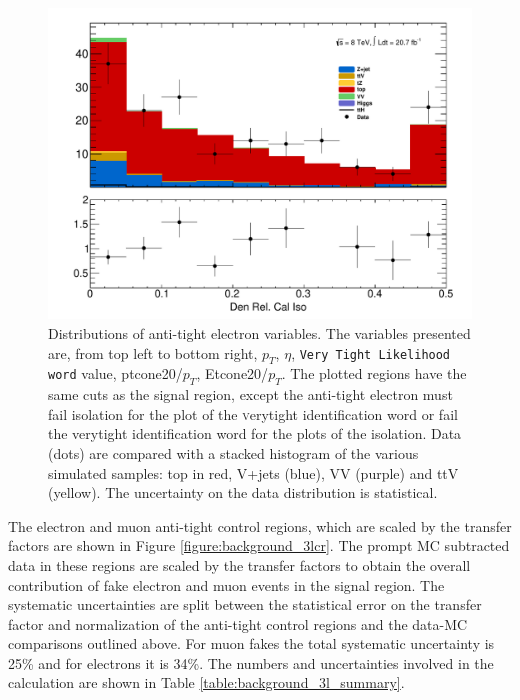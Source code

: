 \begin{figure}[!htbp]
\begin{minipage}[h]{0.5\textwidth}
    \centering \includegraphics[width=\textwidth]{figs/fake/aux_d1_Obj0EtIso20Rel}
  \end{minipage}\hfill
  \caption{Distributions of anti-tight electron variables. The variables presented are, from top left to bottom right, $p_T$, $\eta$, {\tt Very Tight Likelihood word} value, ptcone20/$p_T$, Etcone20/$p_T$. The plotted regions have the same cuts as the signal region, except the anti-tight electron must fail isolation for the plot of the {\textsc verytight} identification word or fail the {verytight} identification word for the plots of the isolation. Data (dots) are compared with a stacked histogram of the various simulated samples: top in red, V+jets (blue), VV (purple) and ttV (yellow). The uncertainty on the data distribution is statistical. }   
  \label{figure:background_electron_dataMC}
\end{figure} 
%

The electron and muon anti-tight control regions, which are scaled by the transfer factors are shown in Figure \ref{figure:background_3lcr}. The prompt MC subtracted data in these regions are scaled by the transfer factors to obtain the overall contribution of fake electron and muon events in the signal region. The systematic uncertainties are split between the statistical error on the transfer factor and normalization of the anti-tight control regions and the data-MC comparisons outlined above. For muon fakes the total systematic uncertainty is 25\% and for electrons it is 34\%. The numbers and uncertainties involved in the calculation are shown in Table \ref{table:background_3l_summary}.  


